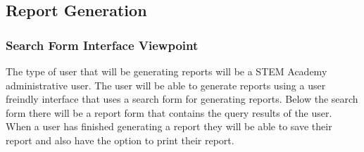 \subsection{Report Generation}

\subsubsection{Search Form Interface Viewpoint}
The type of user that will be generating reports will be a STEM Academy administrative user. The user will be able to generate reports using a user freindly interface that uses a search form for generating reports. Below the search form there will be a report form that contains the query results of the user. When a user has finished generating a report they will be able to save their report and also have the option to print their report. 

